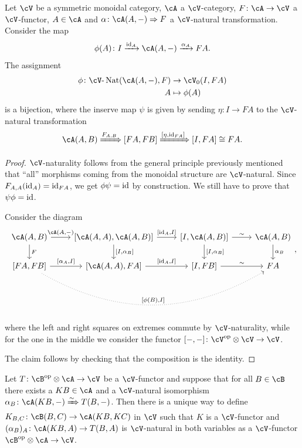 \documentclass[a4paper,11pt,oneside,openany]{scrbook}
\begin{document}
\begin{thm}
	Let $\cV$ be a symmetric monoidal category, $\cA$ a $\cV$-category, $F\colon\cA\rightarrow\cV$ a $\cV$-functor, $A\in\cA$ and $\alpha\colon\cA(A,-)\Rightarrow F$ a $\cV$-natural transformation. Consider the map$$\phi(A)\colon I\xrightarrow{\id_A}\cA(A,-)\xrightarrow{\alpha_A}FA.$$
	The assignment
	\begin{align*}
		\phi\colon\cV\text{-}\Nat(\cA(A,-),F) & \rightarrow\cV_0(I,FA) \\
		A                                     & \mapsto\phi(A)
	\end{align*}
	is a bijection, where the inserve map $\psi$ is given by sending $\eta\colon I\rightarrow FA$ to the $\cV$-natural transformation
	$$\cA(A,B)\xRightarrow{F_{A,B}}[FA,FB]\xRightarrow{[\eta,\id_{FA}]}[I,FA]\cong FA.$$
\end{thm}

\begin{proof}
	$\cV$-naturality follows from the general principle previously mentioned that ``all'' morphisms coming from the monoidal structure are $\cV$-natural. Since $F_{A,A}(\operatorname{id}_A)=\operatorname{id}_{FA}$, we get $\phi\psi=\operatorname{id}$ by construction. We still have to prove that $\psi\phi=\operatorname{id}$.

	Consider the diagram
	\[
		\begin{tikzcd}
			\cA(A,B)\ar[r, "{\cA(A,-)}"]\ar[d, "F"]
			& {[\cA(A,A),\cA(A,B)]}\ar[r, "{[\id_A,I]}"]\ar[d, "{[I,\alpha_B]}"]
			& {[I,\cA(A,B)]}\ar[r, "\sim"]\ar[d, "{[I,\alpha_B]}"]
			& \cA(A,B)\ar[d, "\alpha_B"] \\
			{[FA,FB]}\ar[r, "{[\alpha_A,I]}"]\ar[rrr, bend right, dotted, "{[\phi(B),I]}"]
			& {[\cA(A,A),FA]}\ar[r, "{[\id_A,I]}"]
			& {[I,FB]}\ar[r, "\sim"]
			& FA
		\end{tikzcd}
		,\]
	where the left and right squares on extremes commute by $\cV$-naturality, while for the one in the middle we consider the functor $[-,-]\colon\cV^{\op}\otimes\cV\rightarrow\cV$.

	The claim follows by checking that the composition is the identity.
\end{proof}

\begin{thm}
	Let $T\colon\cB^{\op}\otimes\cA\rightarrow\cV$ be a $\cV$-functor and suppose that for all $B\in\cB$ there exists a $KB\in\cA$ and a $\cV$-natural isomorphism $\alpha_B\colon\cA(KB,-)\xRightarrow{\sim} T(B,-)$. Then there is a unique way to define $K_{B,C}\colon\cB(B,C)\rightarrow\cA(KB,KC)$ in $\cV$ such that $K$ is a $\cV$-functor and $(\alpha_B)_A\colon\cA(KB,A)\rightarrow T(B,A)$ is $\cV$-natural in both variables as a $\cV$-functor $\cB^{\op}\otimes\cA\rightarrow\cV$.
\end{thm}
\end{document}
